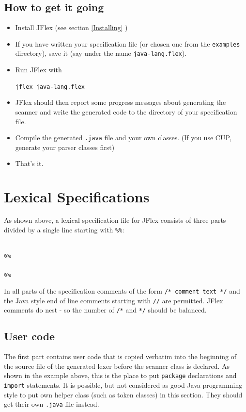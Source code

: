 \documentclass[11pt]{scrartcl}
\begin{document}
\subsection{How to get it going}
\begin{itemize}
\item
Install JFlex (see section \ref{Installing} )

\item
If you have written your specification file (or chosen one from the \texttt{examples}
directory), save it (say under the name \texttt{java-lang.flex}).

\item
Run JFlex with

\texttt{jflex java-lang.flex}

\item
JFlex should then report some progress messages about generating the scanner
and write the generated code to the directory of your specification file.

\item
Compile the generated \texttt{.java} file and your own classes. (If you
use CUP, generate your parser classes first)

\item
That's it.
\end{itemize}


\section{Lexical Specifications\label{Specifications}}
As shown above, a lexical specification file for JFlex consists of three
parts divided by a single line starting with \texttt{\%\%}:

\texttt{}\\
\texttt{\%\%}\\
\texttt{}\\
\texttt{\%\%}\\
\texttt{}

In all parts of the specification comments of the form
\texttt{/* comment text */} and the Java style end of line comments starting with \texttt{//}
are permitted. JFlex comments do nest - so the number of \texttt{/*} and \texttt{*/} 
should be balanced.

\subsection{User code\label{SpecUsercode}}
The first part contains user code that is copied verbatim into the beginning
of the source file of the generated lexer before the scanner class is declared. 
As shown in the example above, this is the place to put \texttt{package} 
declarations and \texttt{import}
statements. It is possible, but not considered as good Java programming
style to put own helper class (such as token classes) in this section.
They should get their own \texttt{.java} file instead.
\end{document}
